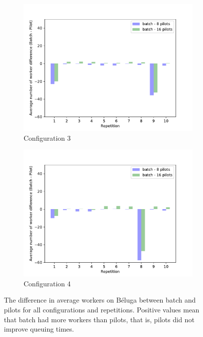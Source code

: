 \begin{figure}
	    \begin{subfigure}[b]{0.475\textwidth}
		\centering
		\includegraphics[width=\textwidth]{figures/spa/nworkers_3_beluga}
		\caption[]%
		{{\small Configuration 3}}
		\label{fig:spa:nwbeluga3}
	    \end{subfigure}
	    \quad
	    \begin{subfigure}[b]{0.475\textwidth}
		\centering
		\includegraphics[width=\textwidth]{figures/spa/nworkers_4_beluga}
		\caption[]%
		{{\small Configuration 4}}
		\label{fig:spa:nwbeluga4}
	    \end{subfigure}
	    \caption{\small  The difference in average workers on B\'eluga
	    between batch and pilots for all configurations and repetitions.
	    Positive values mean that batch had more workers than pilots, that
	    is, pilots did not improve queuing times.}
	    \label{fig:spa:nworkersbeluga}
	\end{figure}
